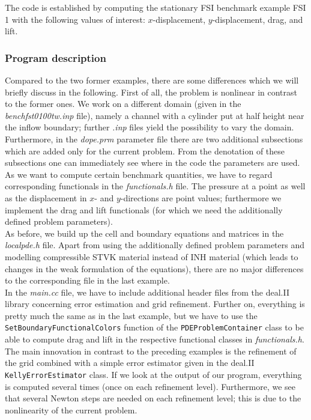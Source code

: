 The code is established by computing the stationary FSI benchmark example FSI 1 with 
the following values of interest: $x$-displacement, $y$-displacement, drag, and lift.   

\subsubsection{Program description}

Compared to the two former examples, there are some differences which we will briefly discuss in the following. First of all, the problem is nonlinear in contrast to the former ones. We work on a different domain (given in the \textit{benchfst0100tw.inp} file), namely a channel with a cylinder put at half height near the inflow boundary; further \textit{.inp} files yield the possibility to vary the domain.\\
Furthermore, in the \textit{dope.prm} parameter file there are two additional subsections which are added only for the current problem. From the denotation of these subsections one can immediately see where in the code the parameters are used.\\
As we want to compute certain benchmark quantities, we have to regard corresponding functionals in the \textit{functionals.h} file. The pressure at a point as well as the displacement in $x$- and $y$-directions are point values; furthermore we implement the drag and lift functionals (for which we need the additionally defined problem parameters).\\
As before, we build up the cell and boundary equations and matrices in the \textit{localpde.h} file. Apart from using the additionally defined problem parameters and modelling compressible STVK material instead of INH material (which leads to changes in the weak formulation of the equations), there are no major differences to the corresponding file in the last example.\\
In the \textit{main.cc} file, we have to include additional header files from the deal.II library concerning error estimation and grid refinement. Further on, everything is pretty much the same as in the last example, but we have to use the \texttt{SetBoundaryFunctionalColors} function of the \texttt{PDEProblemContainer} class to be able to compute drag and lift in the respective functional classes in \textit{functionals.h}.\\
The main innovation in contrast to the preceding examples is the refinement of the grid combined with a simple error estimator given in the deal.II \texttt{KellyErrorEstimator} class. If we look at the output of our program, everything is computed several times (once on each refinement level). Furthermore, we see that several Newton steps are needed on each refinement level; this is due to the nonlinearity of the current problem.

